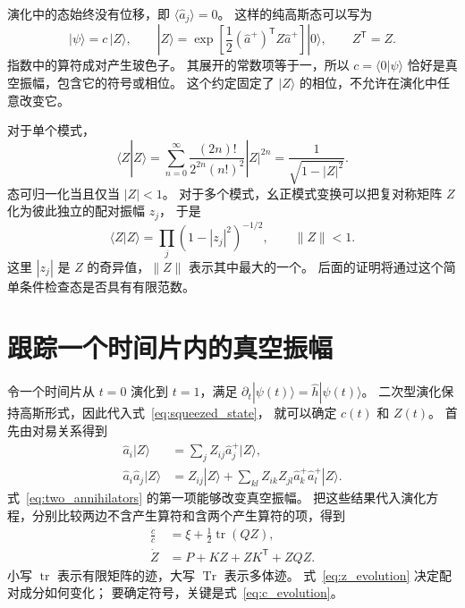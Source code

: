 \documentclass[UTF8,11pt,a4paper,fontset=fandol]{ctexart}
\newcommand{\Tr}{\operatorname{Tr}}
\newcommand{\tr}{\operatorname{tr}}
\newcommand{\trans}{\mathsf T}
\numberwithin{equation}{section}
\begin{document}
演化中的态始终没有位移，即 $\langle\hat a_j\rangle=0$。
这样的纯高斯态可以写为
\begin{equation}
 |\psi\rangle=c\,|Z\rangle,
 \qquad
 |Z\rangle=\exp\!\left[\frac12(\hat a^+)^\trans Z\hat a^+\right]|0\rangle,
 \qquad Z^\trans=Z.
 \label{eq:squeezed_state}
\end{equation}
指数中的算符成对产生玻色子。
其展开的常数项等于一，所以 $c=\langle0|\psi\rangle$
恰好是真空振幅，包含它的符号或相位。
这个约定固定了 $|Z\rangle$ 的相位，不允许在演化中任意改变它。

对于单个模式，
\begin{equation}
 \langle Z|Z\rangle
 =\sum_{n=0}^{\infty}\frac{(2n)!}{2^{2n}(n!)^2}|Z|^{2n}
 =\frac{1}{\sqrt{1-|Z|^2}}.
 \label{eq:squeezed_norm_one}
\end{equation}
态可归一化当且仅当 $|Z|<1$。
对于多个模式，幺正模式变换可以把复对称矩阵 $Z$ 化为彼此独立的配对振幅 $z_j$，
于是
\begin{equation}
 \langle Z|Z\rangle=\prod_j(1-|z_j|^2)^{-1/2},
 \qquad \|Z\|<1.
 \label{eq:squeezed_norm}
\end{equation}
这里 $|z_j|$ 是 $Z$ 的奇异值，$\|Z\|$ 表示其中最大的一个。
后面的证明将通过这个简单条件检查态是否具有有限范数。

\section{跟踪一个时间片内的真空振幅}
\label{sec:evolution}

令一个时间片从 $t=0$ 演化到 $t=1$，满足
$\partial_t|\psi(t)\rangle=\hat h|\psi(t)\rangle$。
二次型演化保持高斯形式，因此代入式~\eqref{eq:squeezed_state}，
就可以确定 $c(t)$ 和 $Z(t)$。
首先由对易关系得到
\begin{align}
 \hat a_i|Z\rangle&=\sum_j Z_{ij}\hat a_j^+|Z\rangle,
 \label{eq:one_annihilator}\\
 \hat a_i\hat a_j|Z\rangle
 &=Z_{ij}|Z\rangle+
   \sum_{kl}Z_{ik}Z_{jl}\hat a_k^+\hat a_l^+|Z\rangle.
 \label{eq:two_annihilators}
\end{align}
式~\eqref{eq:two_annihilators} 的第一项能够改变真空振幅。
把这些结果代入演化方程，分别比较两边不含产生算符和含两个产生算符的项，得到
\begin{align}
 \frac{\dot c}{c}&=\xi+\frac12\tr(QZ),
 \label{eq:c_evolution}\\
 \dot Z&=P+KZ+ZK^\trans+ZQZ.
 \label{eq:z_evolution}
\end{align}
小写 $\tr$ 表示有限矩阵的迹，大写 $\Tr$ 表示多体迹。
式~\eqref{eq:z_evolution} 决定配对成分如何变化；
要确定符号，关键是式~\eqref{eq:c_evolution}。
\end{document}
